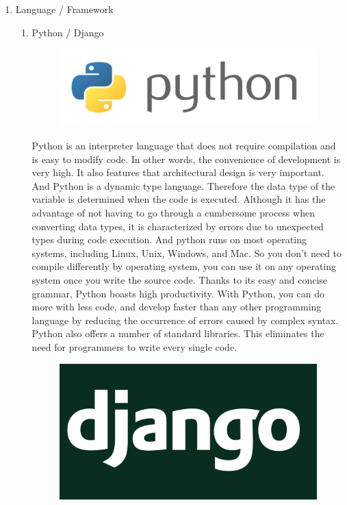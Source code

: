 \documentclass[conference]{IEEEtran}
\begin{document}
\begin{enumerate}
\begin{enumerate}
        \\
    \end{enumerate}
    \item Language / Framework
    \begin{enumerate}
        \item Python / Django
        \begin{figure}[H]
         \centering
         \includegraphics[scale=0.4]{new_assets/python.PNG}
         \end{figure}
        Python is an interpreter language that does not require compilation and is easy to modify code. In other words, the convenience of development is very high. It also features that architectural design is very important. And Python is a dynamic type language. Therefore the data type of the variable is determined when the code is executed. Although it has the advantage of not having to go through a cumbersome process when converting data types, it is characterized by errors due to unexpected types during code execution. And python runs on most operating systems, including Linux, Unix, Windows, and Mac. So you don't need to compile differently by operating system, you can use it on any operating system once you write the source code. Thanks to its easy and concise grammar, Python boasts high productivity. With Python, you can do more with less code, and develop faster than any other programming language by reducing the occurrence of errors caused by complex syntax. Python also offers a number of standard libraries. This eliminates the need for programmers to write every single code.
        \begin{figure}[H]
         \centering
         \includegraphics[scale=0.1]{new_assets/django-logo.png}

\end{figure}
\end{enumerate}
\end{enumerate}
\end{document}
